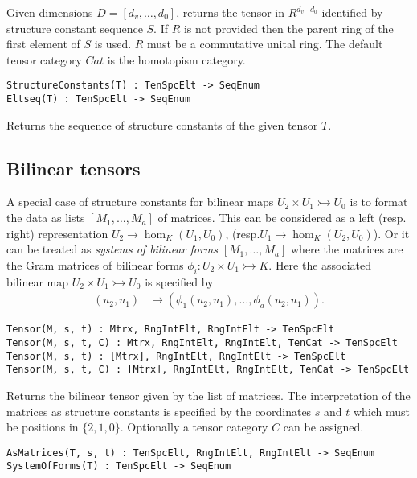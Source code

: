 Given dimensions $D=[d_v,\dots,d_0]$, returns the tensor
in $R^{d_v\cdots d_0}$ identified by structure constant sequence $S$.
If $R$ is not provided then the parent ring of the first element of $S$ is used.  
$R$ must be a commutative unital ring.
The default tensor category $Cat$ is the homotopism category.

\color{blue}
{\small \begin{verbatim}
StructureConstants(T) : TenSpcElt -> SeqEnum
Eltseq(T) : TenSpcElt -> SeqEnum
\end{verbatim} }
\color{black}

Returns the sequence of structure constants of the given tensor $T$. 


\subsection{Bilinear tensors}
A special case of structure constants for bilinear maps $U_2\times U_1\rightarrowtail U_0$
is to format the data as lists $[M_1,\dots, M_a]$ of matrices.
This can be considered as a left (resp. right) representation
$U_2\to \hom_K(U_1,U_0)$, (resp.$U_1\to \hom_K(U_2,U_0)$).  
Or it can be treated as {\em systems of bilinear forms} 
$[M_1,\dots,M_a]$ where the matrices are the Gram matrices of bilinear forms $\phi_i:U_2\times U_1\rightarrowtail K$.
Here the associated bilinear map $U_2\times U_1\rightarrowtail U_0$ is 
specified by
\begin{align*}
	(u_2,u_1) & \mapsto ( \phi_1(u_2,u_1),\dots, \phi_a(u_2,u_1)).
\end{align*}

\color{blue}
{\small \begin{verbatim}
Tensor(M, s, t) : Mtrx, RngIntElt, RngIntElt -> TenSpcElt 
Tensor(M, s, t, C) : Mtrx, RngIntElt, RngIntElt, TenCat -> TenSpcElt
Tensor(M, s, t) : [Mtrx], RngIntElt, RngIntElt -> TenSpcElt 
Tensor(M, s, t, C) : [Mtrx], RngIntElt, RngIntElt, TenCat -> TenSpcElt
\end{verbatim} }
\color{black}

Returns the bilinear tensor given by the list of matrices.  The interpretation
of the matrices as structure constants is specified by the coordinates $s$ and $t$
which must be positions in $\{2,1,0\}$.  Optionally a tensor category $C$ can be assigned.

\color{blue}
{\small \begin{verbatim}
AsMatrices(T, s, t) : TenSpcElt, RngIntElt, RngIntElt -> SeqEnum
SystemOfForms(T) : TenSpcElt -> SeqEnum
\end{verbatim} }
\color{black}

